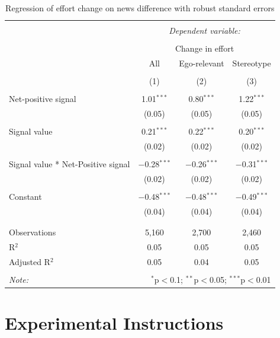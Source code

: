 \documentclass[
  12pt,
]{article}
\begin{document}
\begin{table}[!htbp] \centering 
  \caption{Regression of effort change on news difference with robust standard errors} 
  \label{tab:regression-net} 
\begin{tabular}{@{\extracolsep{5pt}}lccc} 
\\[-1.8ex]\hline 
\hline \\[-1.8ex] 
 & \multicolumn{3}{c}{\textit{Dependent variable:}} \\ 
\cline{2-4} 
\\[-1.8ex] & \multicolumn{3}{c}{Change in effort} \\ 
 & All & Ego-relevant & Stereotype \\ 
\\[-1.8ex] & (1) & (2) & (3)\\ 
\hline \\[-1.8ex] 
 Net-positive signal & 1.01$^{***}$ & 0.80$^{***}$ & 1.22$^{***}$ \\ 
  & (0.05) & (0.05) & (0.05) \\ 
  & & & \\ 
 Signal value & 0.21$^{***}$ & 0.22$^{***}$ & 0.20$^{***}$ \\ 
  & (0.02) & (0.02) & (0.02) \\ 
  & & & \\ 
 Signal value * Net-Positive signal & $-$0.28$^{***}$ & $-$0.26$^{***}$ & $-$0.31$^{***}$ \\ 
  & (0.02) & (0.02) & (0.02) \\ 
  & & & \\ 
 Constant & $-$0.48$^{***}$ & $-$0.48$^{***}$ & $-$0.49$^{***}$ \\ 
  & (0.04) & (0.04) & (0.04) \\ 
  & & & \\ 
\hline \\[-1.8ex] 
Observations & 5,160 & 2,700 & 2,460 \\ 
R$^{2}$ & 0.05 & 0.05 & 0.05 \\ 
Adjusted R$^{2}$ & 0.05 & 0.04 & 0.05 \\ 
\hline 
\hline \\[-1.8ex] 
\textit{Note:}  & \multicolumn{3}{r}{$^{*}$p$<$0.1; $^{**}$p$<$0.05; $^{***}$p$<$0.01} \\ 
\end{tabular} 
\end{table}

\hypertarget{experimental-instructions}{%
\section{Experimental Instructions}\label{experimental-instructions}}
\end{document}
